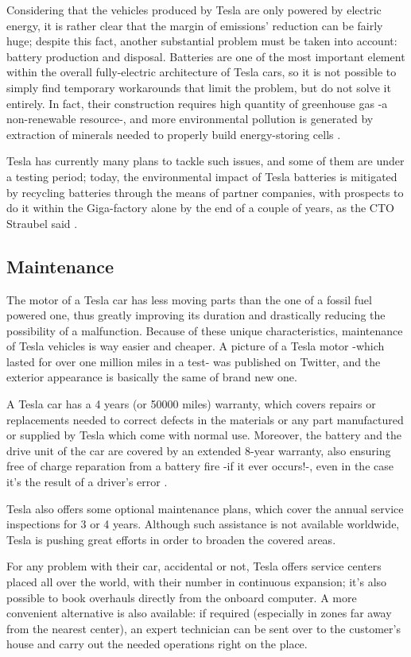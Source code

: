 Considering that the vehicles produced by Tesla are only powered by electric energy, it is rather clear that the margin of emissions' reduction can be fairly huge; despite this fact, another substantial problem must be taken into account: battery production and disposal. Batteries are one of the most important element within the overall fully-electric architecture of Tesla cars, so it is not possible to simply find temporary workarounds that limit the problem, but do not solve it entirely. In fact, their construction requires high quantity of greenhouse gas -a non-renewable resource-, and more environmental pollution is generated by extraction of minerals needed to properly build energy-storing cells \cite{scheele2016cobalt}.

Tesla has currently many plans to tackle such issues, and some of them are under a testing period; today, the environmental impact of Tesla batteries is mitigated by recycling batteries through the means of partner companies, with prospects to do it within the Giga-factory alone by the end of a couple of years, as the CTO Straubel said \cite{recycleBattery}.

\subsection{Maintenance}

The motor of a Tesla car has less moving parts than the one of a fossil fuel powered one, thus greatly improving its duration and drastically reducing the possibility of a malfunction. Because of these unique characteristics, maintenance of Tesla vehicles is way easier and cheaper. A picture of a Tesla motor -which lasted for over one million miles in a test- was published on Twitter, and the exterior appearance is basically the same of brand new one\cite{tesla1mMiles}.

A Tesla car has a 4 years (or 50000 miles) warranty, which covers repairs or replacements needed to correct defects in the materials or any part manufactured or supplied by Tesla which come with normal use. Moreover, the battery and the drive unit of the car are covered by an extended 8-year warranty, also ensuring free of charge reparation from a battery fire -if it ever occurs!-, even in the case it's the result of a driver's error \cite{teslaWarranty}. 

Tesla also offers some optional maintenance plans, which cover the annual service inspections for 3 or 4 years. Although such assistance is not available worldwide, Tesla is pushing great efforts in order to broaden the covered areas. 

For any problem with their car, accidental or not, Tesla offers service centers placed all over the world, with their number in continuous expansion; it's also possible to book overhauls directly from the onboard computer. A more convenient alternative is also available: if required (especially in zones far away from the nearest center), an expert technician can be sent over to the customer's house and carry out the needed operations right on the place.